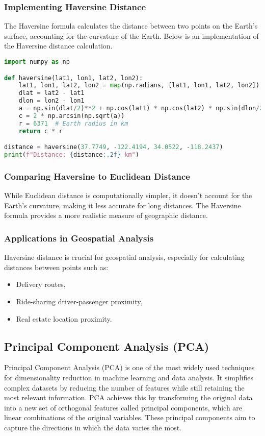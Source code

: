 \documentclass{article}
\begin{document}
\subsubsection{Implementing Haversine Distance}
The Haversine formula calculates the distance between two points on the Earth's surface, accounting for the curvature of the Earth. Below is an implementation of the Haversine distance calculation.

\begin{lstlisting}[language=Python]
import numpy as np

def haversine(lat1, lon1, lat2, lon2):
    lat1, lon1, lat2, lon2 = map(np.radians, [lat1, lon1, lat2, lon2])
    dlat = lat2 - lat1
    dlon = lon2 - lon1
    a = np.sin(dlat/2)**2 + np.cos(lat1) * np.cos(lat2) * np.sin(dlon/2)**2
    c = 2 * np.arcsin(np.sqrt(a))
    r = 6371  # Earth radius in km
    return c * r

distance = haversine(37.7749, -122.4194, 34.0522, -118.2437)
print(f"Distance: {distance:.2f} km")
\end{lstlisting}

\subsubsection{Comparing Haversine to Euclidean Distance}
While Euclidean distance is computationally simpler, it doesn't account for the Earth's curvature, making it less accurate for long distances. The Haversine formula provides a more realistic measure of geographic distance.

\subsubsection{Applications in Geospatial Analysis}
Haversine distance is crucial for geospatial analysis, especially for calculating distances between points such as:
\begin{itemize}
    \item Delivery routes,
    \item Ride-sharing driver-passenger proximity,
    \item Real estate location proximity.
\end{itemize}

\subsection{Principal Component Analysis (PCA)}
Principal Component Analysis (PCA) is one of the most widely used techniques for dimensionality reduction in machine learning and data analysis. It simplifies complex datasets by reducing the number of features while still retaining the most relevant information. PCA achieves this by transforming the original data into a new set of orthogonal features called principal components, which are linear combinations of the original variables. These principal components aim to capture the directions in which the data varies the most.
\end{document}
